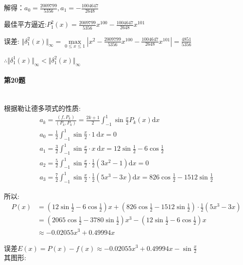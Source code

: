 \documentclass[a4paper]{article}
\begin{document}
        解得：$a_0=\frac{2009799}{5356}, a_1=-\frac{1004647}{2648}$
    
        最佳平方逼近:$P_1^{2}(x)=\frac{2009799}{5356}x^{100}-\frac{1004647}{2648}x^{101}$
    
        误差: $\Vert\delta_1^2(x)\Vert_\infty=\max\limits_{0\leq x\leq 1}|x^2-\frac{2009799}{5356}x^{100}-\frac{1004647}{2648}x^{101}| = \frac{4851}{5356}$

        $\therefore \Vert\delta_1^1(x)\Vert_\infty < \Vert\delta_1^2(x)\Vert_\infty$
\paragraph{第20题}~{}
\\

根据勒让德多项式的性质:
\[
\begin{array}{l}a_{k}=\frac{\left(f, P_{k}\right)}{\left(P_{k}, P_{k}\right)}=\frac{2 k+1}{2} \int_{-1}^{1} \sin \frac{x}{2} P_{k}(x) \mathrm{d} x \\ a_{0}=\frac{1}{2} \int_{-1}^{1} \sin \frac{x}{2} \cdot 1 \mathrm{~d} x=0 \\ a_{1}=\frac{3}{2} \int_{-1}^{1} \sin \frac{x}{2} \cdot x \mathrm{~d} x=12 \sin \frac{1}{2}-6 \cos \frac{1}{2} \\ a_{2}=\frac{5}{2} \int_{-1}^{1} \sin \frac{x}{2} \cdot \frac{1}{2}\left(3 x^{2}-1\right) \mathrm{d} x=0 \\ a_{3}=\frac{7}{2} \int_{-1}^{1} \sin \frac{x}{2} \cdot \frac{1}{2}\left(5 x^{3}-3 x\right) \mathrm{d} x=826 \cos \frac{1}{2}-1512 \sin \frac{1}{2}\end{array}
\] \par 
所以:\\
\[
   \begin{aligned} P(x) & =\left(12 \sin \frac{1}{2}-6 \cos \frac{1}{2}\right) x+\left(826 \cos \frac{1}{2}-1512 \sin \frac{1}{2}\right) \cdot \frac{1}{2}\left(5 x^{3}-3 x\right) \\ & =\left(2065 \cos \frac{1}{2}-3780 \sin \frac{1}{2}\right) x^{3}-\left(12 \sin \frac{1}{2}-6 \cos \frac{1}{2}\right) x \\ & \approx-0.02055 x^{3}+0.49994 x\end{aligned}    
\]\par
误差$E(x)=P(x)-f(x)\approx -0.02055 x^{3}+0.49994 x - \sin \frac{x}{2}$ \\
\newpage
其图形:
\end{document}

